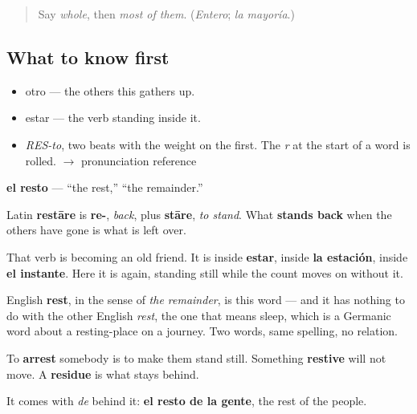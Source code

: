 \label{lesson:ES-C352-resto}



\begin{quote}
Say \emph{whole}, then \emph{most of them}. (\emph{Entero}; \emph{la mayoría}.)
\end{quote}

\subsection*{What to know first}
\begin{itemize}
\raggedright
  \item otro — the others this gathers up.
  \item estar — the verb standing inside it.
\end{itemize}

\begin{sounds}
\begin{itemize}
\raggedright
  \item \emph{RES-to}, two beats with the weight on the first. The \emph{r} at the start of a word is rolled. $\to$ pronunciation reference
\end{itemize}
\end{sounds}

\begin{cousinweb}
\textbf{el resto} — \textquotedblleft{}the rest,\textquotedblright{} \textquotedblleft{}the remainder.\textquotedblright{}

Latin \textbf{restāre} is \textbf{re-}, \emph{back}, plus \textbf{stāre}, \emph{to stand}. What \textbf{stands back} when the others have gone is what is left over.

That verb is becoming an old friend. It is inside \textbf{estar}, inside \textbf{la estación}, inside \textbf{el instante}. Here it is again, standing still while the count moves on without it.

English \textbf{rest}, in the sense of \emph{the remainder}, is this word — and it has nothing to do with the other English \emph{rest}, the one that means sleep, which is a Germanic word about a resting-place on a journey. Two words, same spelling, no relation.

To \textbf{arrest} somebody is to make them stand still. Something \textbf{restive} will not move. A \textbf{residue} is what stays behind.

It comes with \emph{de} behind it: \textbf{el resto de la gente}, the rest of the people.
\end{cousinweb}

